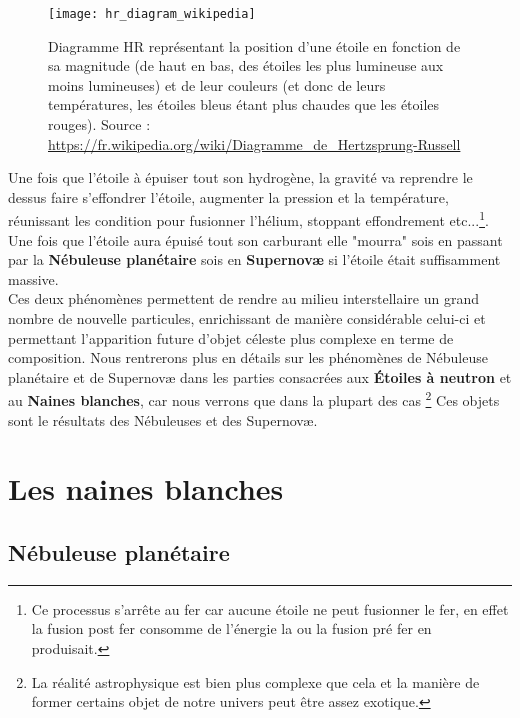 \documentclass[11pt]{book} %
\begin{document}
\begin{figure}[h]
    \center
    \texttt{[image: hr\_diagram\_wikipedia]}
    \caption{Diagramme HR représentant la position d'une étoile en fonction de sa magnitude (de haut en bas, des étoiles les plus lumineuse aux moins lumineuses) et de leur couleurs (et donc de leurs températures, les étoiles bleus étant plus chaudes que les étoiles rouges). Source : \url{https://fr.wikipedia.org/wiki/Diagramme_de_Hertzsprung-Russell}}
\end{figure}
Une fois que l'étoile à épuiser tout son hydrogène, la gravité va reprendre le dessus faire s’effondrer l'étoile, augmenter la pression et la température, réunissant les condition pour fusionner l'hélium, stoppant effondrement etc...\footnote{Ce processus s’arrête au fer car aucune étoile ne peut fusionner le fer, en effet la fusion post fer consomme de l'énergie la ou la fusion pré fer en produisait.}. Une fois que l'étoile aura épuisé tout son carburant elle "mourra" sois en passant par la \textbf{Nébuleuse planétaire} sois en \textbf{Supernovæ} si l'étoile était suffisamment massive.\\
Ces deux phénomènes permettent de rendre au milieu interstellaire un grand nombre de nouvelle particules, enrichissant de manière considérable celui-ci et permettant l'apparition future d'objet céleste plus complexe en terme de composition.
\n
Nous rentrerons plus en détails sur les phénomènes de Nébuleuse planétaire et de Supernovæ dans les parties consacrées aux \textbf{Étoiles à neutron} et au \textbf{Naines blanches}, car nous verrons que dans la plupart des cas \footnote{La réalité astrophysique est bien plus complexe que cela et la manière de former certains objet de notre univers peut être assez exotique.} Ces objets sont le résultats des Nébuleuses et des Supernovæ.

\section{Les naines blanches}
\subsection{Nébuleuse planétaire}
\end{document}
